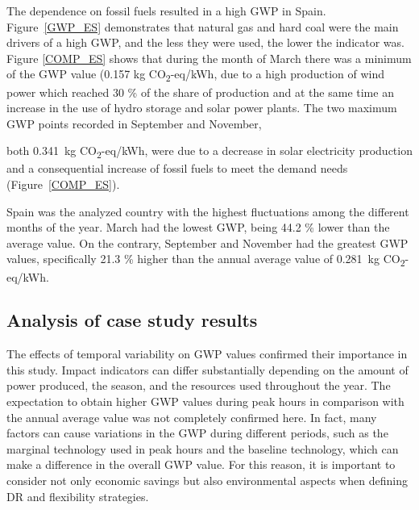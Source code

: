 {{{The dependence on  fossil fuels resulted in a high GWP in Spain. Figure~\ref{GWP_ES} demonstrates that natural gas and hard coal were the main drivers of a high GWP, and the less they were used, the lower the indicator was. Figure \ref{COMP_ES} shows that during the month of March there was a minimum of the GWP value {(0.157 kg CO\textsubscript2-eq/kWh}, due to a high production of wind power which reached 30 \% of the share of production and at the same time an increase in the use of hydro storage and solar power plants. The two maximum GWP points recorded in September and November, {both  0.341~kg CO\textsubscript2-eq/kWh, were due to a decrease in solar electricity production and a consequential increase of fossil fuels to meet the demand needs (Figure~\ref{COMP_ES}). {Spain was the analyzed country with the highest fluctuations among the different months of the year. March had the lowest GWP, being 44.2 \% lower than the average value. On the contrary, September and November had the greatest GWP values, specifically 21.3 \% higher than the annual average value of 0.281~kg CO\textsubscript2-eq/kWh.

\subsection{Analysis of case study results} \label{Discussion}

The effects of temporal variability on GWP values confirmed their importance in this study. Impact indicators can differ substantially depending on the amount of power produced, the season, and the resources used throughout the year. The expectation to obtain higher GWP values during peak hours in comparison with the annual average value was not completely confirmed here. In fact, many factors can cause variations in the GWP during different periods, such as the marginal technology used in peak hours and the baseline technology, which can make a difference in the overall GWP value. {For this reason, it is important to consider not only economic savings but also environmental aspects when defining DR and flexibility strategies.}



}}}}}

